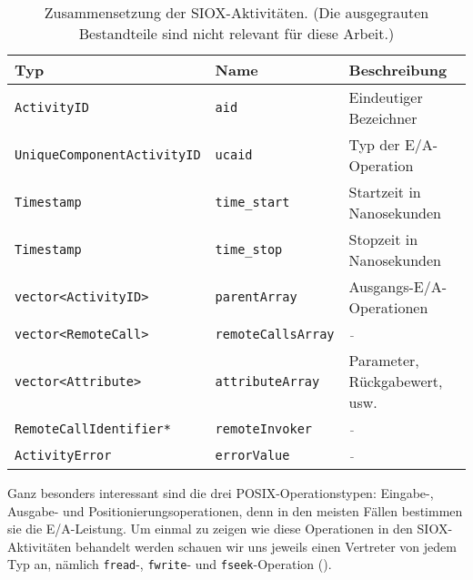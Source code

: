\begin{table}[h]
	\centering
	\begin{scriptsize}
		\begin{tabular}{l | l | l}
			Typ & Name & Beschreibung \\
			\hline
			\lstinline{ActivityID}                                              & \lstinline{aid}                                                & Eindeutiger Bezeichner \\
			\lstinline{UniqueComponentActivityID}                               & \lstinline{ucaid}                                              & Typ der E/A-Operation \\
			\lstinline{Timestamp}                                               & \lstinline{time_start}                                         & Startzeit in Nanosekunden\\
			\lstinline{Timestamp}                                               & \lstinline{time_stop}                                          & Stopzeit in Nanosekunden \\
			\lstinline{vector<ActivityID>}                                      & \lstinline{parentArray}                                        & Ausgangs-E/A-Operationen \\
			\lstinline[basicstyle=\ttfamily\color{gray}]{vector<RemoteCall>}    & \lstinline[basicstyle=\ttfamily\color{gray}]{remoteCallsArray} & \textcolor{gray}{\textit{-}} \\
			\lstinline{vector<Attribute>}                                       & \lstinline{attributeArray}                                     & Parameter, Rückgabewert, usw. \\
			\lstinline[basicstyle=\ttfamily\color{gray}]{RemoteCallIdentifier*} & \lstinline[basicstyle=\ttfamily\color{gray}]{remoteInvoker}    & \textcolor{gray}{\textit{-}} \\
			\lstinline[basicstyle=\ttfamily\color{gray}]{ActivityError}         & \lstinline[basicstyle=\ttfamily\color{gray}]{errorValue}       & \textcolor{gray}{\textit{-}}
		\end{tabular}
	\end{scriptsize}
	\caption{Zusammensetzung der SIOX-Aktivitäten. (Die ausgegrauten Bestandteile sind nicht relevant für diese Arbeit.)}
	\label{tab:bas:activity}
\end{table}

Ganz besonders interessant sind die drei POSIX-Operationstypen: Eingabe-, Ausgabe- und Positionierungsoperationen, denn in den meisten Fällen bestimmen sie die E/A-Leistung.
Um einmal zu zeigen wie diese Operationen in den SIOX-Aktivitäten behandelt werden schauen wir uns jeweils einen Vertreter von jedem Typ an, nämlich \lstinline{fread}-, \lstinline{fwrite}- und \lstinline{fseek}-Operation ().

